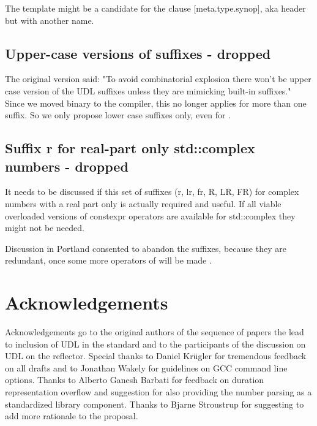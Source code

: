 \documentclass[ebook,11pt,article]{memoir}
\begin{document}
The template  might be a candidate for the clause [meta.type.synop], aka header  but with another name.

\subsection{Upper-case versions of suffixes - dropped}

The original version said: "To avoid combinatorial explosion there won't be upper case version of the UDL suffixes unless they are mimicking built-in suffixes." Since we moved binary to the compiler, this no longer applies for more than one suffix. So we only propose lower case suffixes only, even for .



\subsection{Suffix r for real-part only std::complex numbers - dropped}
It needs to be discussed if this set of suffixes (r, lr, fr, R, LR, FR) for complex numbers with a real part only is actually required and useful. If all viable overloaded versions of constexpr operators are available for std::complex they might not be needed.

Discussion in Portland consented to abandon the  suffixes, because they are redundant, once some more operators of  will be made .

\section{Acknowledgements}
Acknowledgements go to the original authors of the sequence of papers the lead to inclusion of UDL in the standard and to the participants of the discussion on UDL on the reflector. Special thanks to Daniel Kr\"ugler for tremendous feedback on all drafts and to Jonathan Wakely for guidelines on GCC command line options. Thanks to Alberto Ganesh Barbati for feedback on duration representation overflow and suggestion for also providing the number parsing as a standardized library component. Thanks to Bjarne Stroustrup for suggesting to add more rationale to the proposal.
\end{document}
